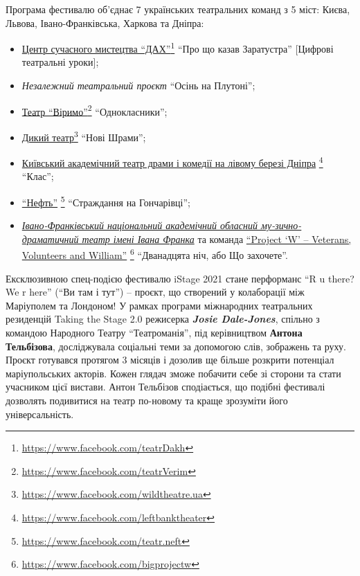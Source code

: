 Програма фестивалю об'єднає 7 українських театральних команд з 5 міст: Києва,
Львова, Івано-Франківська, Харкова та Дніпра:

\begin{itemize} %
\item \href{https://www.facebook.com/teatrDakh}{Центр сучасного мистецтва \enquote{ДАХ}}\footnote{\url{https://www.facebook.com/teatrDakh}} \enquote{Про що казав Заратустра} [Цифрові театральні уроки];  
\item \emph{Незалежний театральний проєкт} \enquote{Осінь на Плутоні};
\item \href{https://www.facebook.com/teatrVerim}{Театр \enquote{Віримо}}\footnote{\url{https://www.facebook.com/teatrVerim}} \enquote{Однокласники};
\item \href{https://www.facebook.com/wildtheatre.ua}{Дикий театр}\footnote{\url{https://www.facebook.com/wildtheatre.ua}} \enquote{Нові Шрами};
\item \href{https://www.facebook.com/leftbanktheater}{Київський академічний театр драми і комедії на лівому березі Дніпра}%
\footnote{\url{https://www.facebook.com/leftbanktheater}} \enquote{Клас};
\item \href{https://www.facebook.com/teatr.neft}{\enquote{Нефть}}%
\footnote{\url{https://www.facebook.com/teatr.neft}} \enquote{Страждання на Гончарівці};
\item \href{https://www.facebook.com/dramteatr.if}{\emph{Івано-Франківський національний академічний обласний му\hyp{}зично-драматичний театр імені Івана Франка}} та команда \href{https://www.facebook.com/bigprojectw}{\enquote{Project \enquote{W} – Veterans, Volunteers and William}}%
\footnote{\url{https://www.facebook.com/bigprojectw}} \enquote{Дванадцята ніч, або Що захочете}.
\end{itemize} %


Ексклюзивною спец-подією фестивалю iStage 2021 стане перформанс \enquote{R u there? We
r here} (\enquote{Ви там і тут}) – проєкт, що створений у колаборації між Маріуполем та
Лондоном! У рамках програми міжнародних театральних резиденцій Taking the Stage
2.0 режисерка  \emph{\textbf{Josie Dale-Jones}}, спільно з командою Народного Театру
\enquote{Театроманія}, під керівництвом \textbf{Антона Тельбізова}, досліджувала соціальні теми
за допомогою слів, зображень та руху. Проєкт готувався протягом 3 місяців і
дозолив ще більше розкрити потенціал маріупольських акторів. Кожен глядач зможе
побачити себе зі сторони та стати учасником цієї вистави. Антон Тельбізов
сподіається, що подібні фестивалі дозволять подивитися на театр по-новому та
краще зрозуміти його універсальність.

